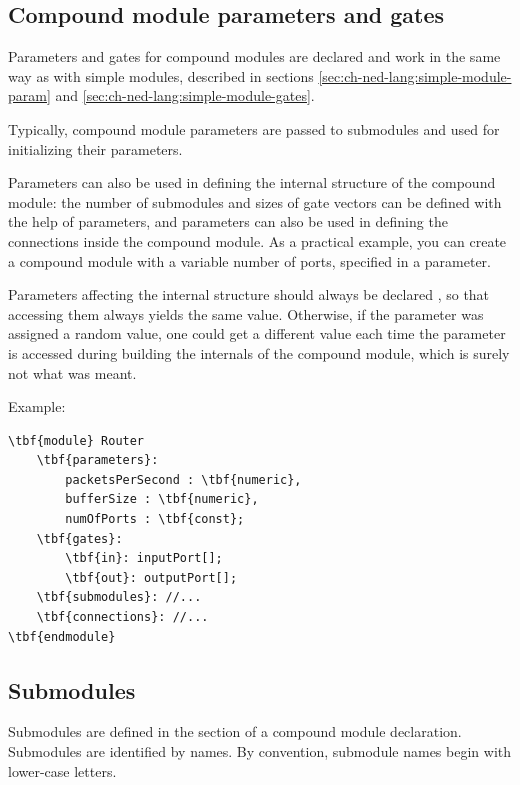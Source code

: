 \subsection{Compound module parameters and gates}

Parameters and gates 
for compound modules are declared and work in the same way
as with simple modules, described in sections
\ref{sec:ch-ned-lang:simple-module-param}
and \ref{sec:ch-ned-lang:simple-module-gates}.

Typically, compound module parameters are passed to submodules and
used for initializing their parameters.

Parameters can also be used in defining the internal structure of
the compound module: the number of submodules and sizes of gate vectors
can be defined with the help of parameters, and parameters can
also be used in defining the connections inside the compound module.
As a practical example, you can create a  compound module
with a variable number of ports, specified in a  parameter.

Parameters affecting the internal structure should always be declared
, so that accessing them always yields the same value.
Otherwise, if the parameter was assigned a random value, one could
get a different value each time the parameter is accessed during building
the internals of the compound module, which is surely not what was meant.

Example:

\begin{Verbatim}[commandchars=\\\{\}]
\tbf{module} Router
    \tbf{parameters}:
        packetsPerSecond : \tbf{numeric},
        bufferSize : \tbf{numeric},
        numOfPorts : \tbf{const};
    \tbf{gates}:
        \tbf{in}: inputPort[];
        \tbf{out}: outputPort[];
    \tbf{submodules}: //...
    \tbf{connections}: //...
\tbf{endmodule}
\end{Verbatim}


\subsection{Submodules}

Submodules are defined in the
 section of a compound
module declaration. Submodules are identified by names.
By convention, submodule names begin with lower-case letters.

